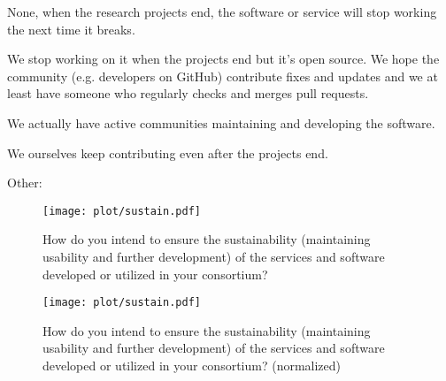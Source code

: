 \documentclass[headsepline,titlepage,twoside,12pt,toc=flat,headings=normal]{scrreprt}
\newcommand{\otherbox}{\fbox{\phantom{This is how big an answer would be.}}}
\begin{document}
\begin{answers}
\item None, when the research projects end, the software or service will stop working the next time it breaks.
\item We stop working on it when the projects end but it's
  open source.
We hope the community (e.g. developers on GitHub)
  contribute fixes and updates and we at least have someone who
  regularly checks and merges pull requests.
\item We actually have active communities maintaining and developing the
  software.
\item We ourselves keep contributing even after the projects end.
\item Other: \otherbox
\end{answers}

\begin{figure}[h!]
\caption[Ensuring sustainability of services and software]{How do you intend to ensure the sustainability (maintaining usability and further development) of the services and software developed or utilized in your consortium?}
\label{fig:sustain}
\texttt{[image: plot/sustain.pdf]}
\end{figure}

\begin{figure}[h!]
\caption[Ensuring sustainability of services and software (normalized)]{How do you intend to ensure the sustainability (maintaining usability and further development) of the services and software developed or utilized in your consortium? (normalized)}
\label{fig:sustain_n}
\texttt{[image: plot/sustain.pdf]}
\end{figure}
\end{document}
